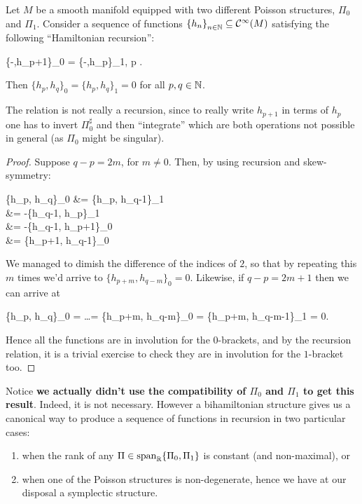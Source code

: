 \documentclass[main.tex]{subfiles}
\begin{document}
\begin{theorem}[Magri]
\label{th:magri}
	Let $M$ be a smooth manifold equipped with two different Poisson structures, $\Pi_0$ and $\Pi_1$. Consider a sequence of functions $\left\{h_{n}\right\}_{n \in \mathbb{N}} \subseteq \mathcal{C}^\infty(M)$ satisfying the following ``Hamiltonian recursion'':
	\begin{eqalign}
		\{-,h_{p+1}\}_0 = \{-,h_p\}_1, \quad \forall p \in \N.
	\end{eqalign}
	Then $\{h_p,h_q\}_0 = \{h_p,h_q\}_1 = 0$ for all $p,q \in \mathbb{N}$.
\end{theorem}
\begin{remark}
	The relation is not really a recursion, since to really write $h_{p+1}$ in terms of $h_p$ one has to invert $\Pi_0^\sharp$ and then ``integrate'' which are both operations not possible in general (as $\Pi_0$ might be singular).
\end{remark}
\begin{proof}
	Suppose $q-p=2m$, for $m \neq 0$. Then, by using recursion and skew-symmetry:
	\begin{eqalign}
		\{h_p, h_q\}_0 &= \{h_p, h_{q-1}\}_1\\
		&= -\{h_{q-1}, h_p\}_1\\
		&= -\{h_{q-1}, h_{p+1}\}_0\\
		&= \{h_{p+1}, h_{q-1}\}_0
	\end{eqalign}
	We managed to dimish the difference of the indices of $2$, so that by repeating this $m$ times we'd arrive to $\{h_{p+m}, h_{q-m}\}_0 =0$. Likewise, if $q-p = 2m+1$ then we can arrive at
	\begin{eqalign}
		\{h_p, h_q\}_0 = \ldots = \{h_{p+m}, h_{q-m}\}_0 = \{h_{p+m}, h_{q-m-1}\}_1 = 0.
	\end{eqalign}
	Hence all the functions are in involution for the $0$-brackets, and by the recursion relation, it is a trivial exercise to check they are in involution for the $1$-bracket too.
\end{proof}

Notice \textbf{we actually didn't use the compatibility of $\Pi_0$ and $\Pi_1$ to get this result}. Indeed, it is not necessary. However a bihamiltonian structure gives us a canonical way to produce a sequence of functions in recursion in two particular cases:

\begin{enumerate}
	\item when the rank of any $\Pi \in \operatorname{span}_{\mathbb{R}} \{\Pi_0, \Pi_1\}$ is constant (and non-maximal), or
	\item when one of the Poisson structures is non-degenerate, hence we have at our disposal a symplectic structure.
\end{enumerate}
\end{document}
